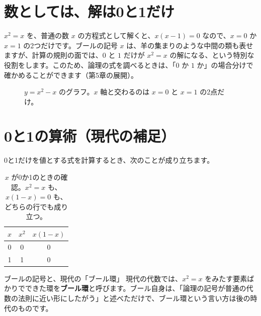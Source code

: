 \documentclass[a4paper,11pt,openany]{ltjsbook}
\begin{document}
\section{数としては、解は0と1だけ}

$x^2=x$ を、普通の数 $x$ の方程式として解くと、$x(x-1)=0$ なので、$x=0$ か $x=1$ の2つだけです。ブールの記号 $x$ は、羊の集まりのような中間の類も表せますが、計算の規則の面では、$0$ と $1$ だけが $x^2=x$ の解になる、という特別な役割をします。このため、論理の式を調べるときは、「$0$ か $1$ か」の場合分けで確かめることができます（第5章の展開）。

\begin{figure}[htbp]
\centering
{}
\caption{$y=x^2-x$ のグラフ。$x$ 軸と交わるのは $x=0$ と $x=1$ の2点だけ。}
\end{figure}

\section{0と1の算術（現代の補足）}

0と1だけを値とする式を計算するとき、次のことが成り立ちます。

\begin{table}[htbp]
\centering
\begin{tabular}{c|cc}
\toprule
$x$ & $x^2$ & $x(1-x)$\\
\midrule
0 & 0 & 0\\
1 & 1 & 0\\
\bottomrule
\end{tabular}
\caption{$x$ が0か1のときの確認。$x^2=x$ も、$x(1-x)=0$ も、どちらの行でも成り立つ。}
\end{table}

\begin{notebox}{ブールの記号と、現代の「ブール環」}
現代の代数では、$x^2=x$ をみたす要素ばかりでできた環を\textbf{ブール環}と呼びます。ブール自身は、「論理の記号が普通の代数の法則に近い形にしたがう」と述べただけで、ブール環という言い方は後の時代のものです。
\end{notebox}
\end{document}
